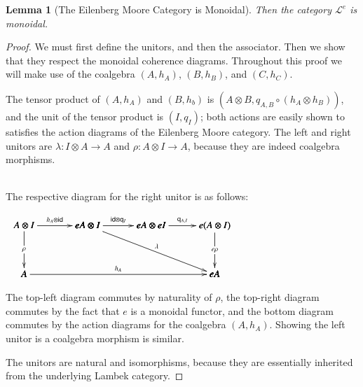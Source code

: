 \documentclass{article}
\newtheorem{lemma}[theorem]{Lemma}
\let\mto\to
\let\to\relax
\newcommand{\to}{\rightarrow}
\newcommand{\cat}[1]{\mathcal{#1}}
\newcommand{\id}[0]{\mathsf{id}}
\newcommand{\q}[1]{\mathsf{q}_{#1}}
\begin{document}
\begin{lemma}[The Eilenberg Moore Category is Monoidal]
  \label{lemma:the_eilenberg_moore_category_is_monoidal}
  Then the category $\cat{L}^e$ is monoidal.
\end{lemma}
\begin{proof}
  We must first define the unitors, and then the associator.  Then we
  show that they respect the monoidal coherence diagrams. Throughout this
  proof we will make use of the coalgebra $(A,h_A)$, $(B,h_B)$, and
  $(C,h_C)$.

  The tensor product of $(A, h_A)$ and $(B, h_b)$ is $(A \otimes
  B,q_{A,B} \circ (h_A \otimes h_B))$, and the unit of the tensor
  product is $(I, q_I)$; both actions are easily shown to satisfies
  the action diagrams of the Eilenberg Moore category. The left and
  right unitors are $\lambda : I \otimes A \mto A$ and $\rho : A
  \otimes I \mto A$, because they are indeed coalgebra morphisms.

  \ \\
  \noindent
  The respective diagram for the right unitor is as follows:
  \begin{center}
    \begin{math}
      \begin{array}{lll}
        \bfig
        \square|amma|/->`->``/<650,500>[A \otimes I`eA \otimes I`A`;h_A \otimes \id{}`\rho``]
        \morphism(650,500)<650,0>[eA \otimes I`eA \otimes eI;\id{} \otimes \q{I}]
        \square(1300,0)|amma|/->``->`/<650,500>[eA \otimes eI`e(A \otimes I)``eA;\q{A,I}``e\rho`]

        \morphism(650,500)<1300,-500>[eA \otimes I`eA;\lambda]
        \morphism<1950,0>[A`eA;h_A]
        \efig
      \end{array}
    \end{math}
  \end{center}
  The top-left diagram commutes by naturality of $\rho$, the top-right
  diagram commutes by the fact that $e$ is a monoidal functor, and the
  bottom diagram commutes by the action diagrams for the coalgebra
  $(A,h_A)$. Showing the left unitor is a coalgebra morphism is
  similar. 

  The unitors are natural and isomorphisms, because they are
  essentially inherited from the underlying Lambek category.


\end{proof}
\end{document}
